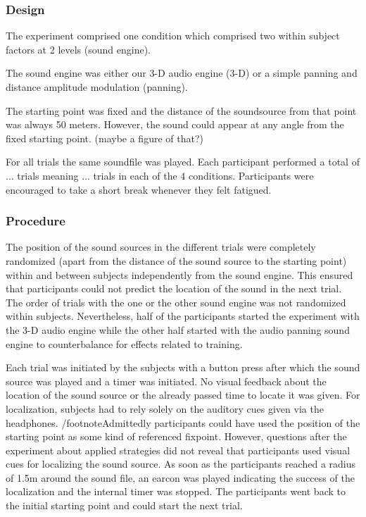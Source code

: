 \documentclass[journal]{IEEEtran}
\begin{document}
\subsubsection{Design}
The experiment comprised one condition which comprised two within subject factors at 2 levels (sound engine).

The sound engine was either our 3-D audio engine (3-D) or a simple panning and distance amplitude modulation (panning).

The starting point was fixed and the distance of the soundsource from that point was always 50 meters. However, the sound could appear at any angle from the fixed starting point. (maybe a figure of that?)

For all trials the same soundfile was played. Each participant performed a total of ... trials meaning ... trials in each of the 4 conditions. Participants were encouraged to take a short break whenever they felt fatigued.

\subsubsection{Procedure}
The position of the sound sources in the different trials were completely randomized (apart from the distance of the sound source to the starting point) within and between subjects independently from the sound engine. This ensured that participants could not predict the location of the sound in the next trial. The order of trials with the one or the other sound engine was not randomized within subjects. Nevertheless, half of the participants started the experiment with the 3-D audio engine while the other half started with the audio panning sound engine to counterbalance for effects related to training.

Each trial was initiated by the subjects with a button press after which the sound source was played and a timer was initiated. No visual feedback about the location of the sound source or the already passed time to locate it was given. For localization, subjects had to rely solely on the auditory cues given via the headphones. /footnote{Admittedly participants could have used the position of the starting point as some kind of referenced fixpoint. However, questions after the experiment about applied strategies did not reveal that participants used visual cues for localizing the sound source.} As soon as the participants reached a radius of 1.5m around the sound file, an earcon was played indicating the success of the localization and the internal timer was stopped. The participants went back to the initial starting point and could start the next trial.
\end{document}
